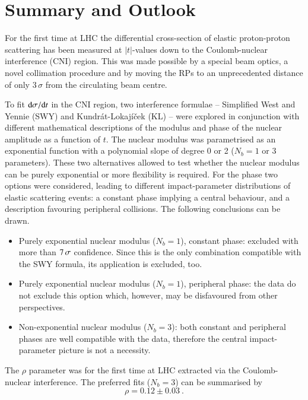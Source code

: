 \section{Summary and Outlook}
\label{sec:summary}
For the first time at LHC the differential cross-section of elastic proton-proton scattering has been measured at $|t|$-values down to the Coulomb-nuclear interference (CNI) region. This was made possible by a special beam optics, a novel collimation procedure and by moving the RPs to an unprecedented distance of only $3\,\sigma$ from the circulating beam centre.

To fit ${\rm d}\sigma/{\rm d} t$ in the CNI region, two interference formulae -- Simplified West and Yennie (SWY) and Kundr\' at-Lokaj\' i\v cek (KL) -- 
were explored in conjunction with different mathematical descriptions of the modulus and phase of the nuclear amplitude as a function of $t$. The nuclear modulus was parametrised as an exponential function with a polynomial slope of degree 0 or 2 ($N_b=1$ or $3$ parameters). These two alternatives allowed to test whether the nuclear modulus can be purely exponential or more flexibility is required. For the phase two options were considered, leading to different impact-parameter distributions of elastic scattering events: a constant phase implying a central behaviour, and a description favouring peripheral collisions. The following conclusions can be drawn.
\begin{itemize}
\item Purely exponential nuclear modulus ($N_b=1$), constant phase: excluded with more than $7\,{\rm \sigma}$ confidence. Since this is the only combination compatible with the SWY formula, its application is excluded, too.
\item Purely exponential nuclear modulus ($N_b=1$), peripheral phase: the data do not exclude this option which, however, may be disfavoured from other perspectives.
\item Non-exponential nuclear modulus ($N_b=3$): both constant and peripheral phases are well compatible with the data, therefore the central impact-parameter picture is not a necessity.
\end{itemize}

The $\rho$ parameter was for the first time at LHC extracted via the Coulomb-nuclear interference. The preferred fits ($N_b=3$) can be summarised by
\begin{equation}
\label{eq:rho final}
\rho = 0.12 \pm 0.03\ .
\end{equation}

